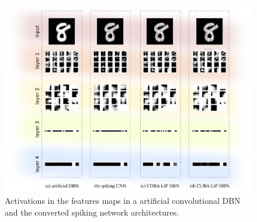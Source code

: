 \begin{figure}[h!]
	\centering
	\includegraphics[width=\textwidth]{imgs/convert/compl4.png}
	\caption{Activations in the features maps in a artificial convolutional DBN and the converted spiking network architectures. }
	\label{fig:convacts}
\end{figure}

